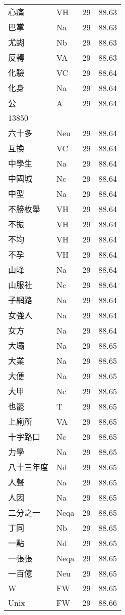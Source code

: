 \documentclass[twocolumn]{book}
\begin{document}
\begin{supertabular}{llrr}
心痛 & VH & 29 &  88.63\\
巴掌 & Na & 29 &  88.63\\
尤蝴 & Nb & 29 &  88.63\\
反轉 & VA & 29 &  88.63\\
化驗 & VC & 29 &  88.64\\
化身 & Na & 29 &  88.64\\
公 & A & 29 &  88.64\\
13850\\
六十多 & Neu & 29 &  88.64\\
互換 & VC & 29 &  88.64\\
中學生 & Na & 29 &  88.64\\
中國城 & Nc & 29 &  88.64\\
中型 & Na & 29 &  88.64\\
不勝枚舉 & VH & 29 &  88.64\\
不振 & VH & 29 &  88.64\\
不均 & VH & 29 &  88.64\\
不孕 & VH & 29 &  88.64\\
山峰 & Na & 29 &  88.64\\
山服社 & Nc & 29 &  88.64\\
子網路 & Na & 29 &  88.64\\
女強人 & Na & 29 &  88.64\\
女方 & Na & 29 &  88.64\\
大壩 & Na & 29 &  88.65\\
大業 & Na & 29 &  88.65\\
大便 & Na & 29 &  88.65\\
大甲 & Nc & 29 &  88.65\\
也罷 & T & 29 &  88.65\\
上廁所 & VA & 29 &  88.65\\
十字路口 & Nc & 29 &  88.65\\
力學 & Na & 29 &  88.65\\
八十三年度 & Nd & 29 &  88.65\\
人聲 & Na & 29 &  88.65\\
人因 & Na & 29 &  88.65\\
二分之一 & Neqa & 29 &  88.65\\
丁同 & Nb & 29 &  88.65\\
一點 & Nd & 29 &  88.65\\
一張張 & Neqa & 29 &  88.65\\
一百億 & Neu & 29 &  88.65\\
W & FW & 29 &  88.65\\
Unix & FW & 29 &  88.66\\

\end{supertabular}
\end{document}
